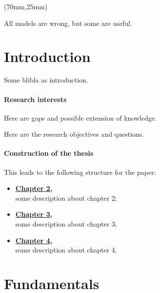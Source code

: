 
\begin{textblock*}{.7\textwidth}(70mm,25mm)
    \begin{fquote}
        All models are wrong, but some are useful.
    \end{fquote}
\end{textblock*}

\chapter{Introduction}
\label{chap:intro}

Some blibla as introduction. \autocite{machowskiPowerSystemDynamics2020}
\lipsum[1-3]

\clearpage

\subsubsection{Research interests}

Here are gaps and possible extension of knowledge.

Here are the research objectives and questions.

\subsubsection{Construction of the thesis}

This leads to the following structure for the paper: 
\begin{itemize}
    \item \textbf{\hyperref[chap:fundamentals]{Chapter 2},}\\
    some description about chapter 2;
    \item \textbf{\hyperref[chap:methods]{Chapter 3},}\\
    some description about chapter 3;
    \item \textbf{\hyperref[chap:results]{Chapter 4},}\\
    some description about chapter 4.
\end{itemize}

\chapter{Fundamentals}
\label{ch:fundamentals}

